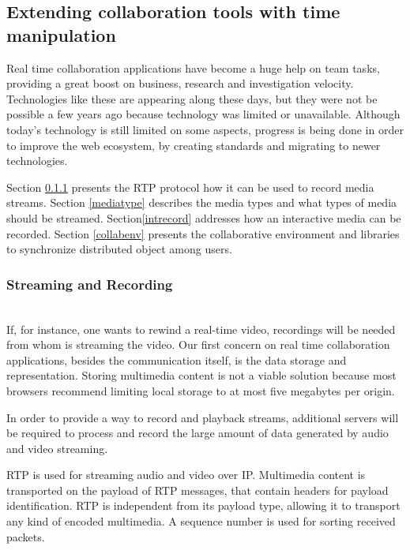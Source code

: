 \subsection{Extending collaboration tools with time manipulation}
\label{collab}

Real time collaboration applications have become a huge help on team tasks, providing a great boost on business, research and investigation velocity. Technologies like these are appearing along these days, but they were not be possible a few years ago because technology was limited or unavailable. Although today's technology is still limited on some aspects, progress is being done in order to improve the web ecosystem, by creating standards and migrating to newer technologies.

Section \ref{recstream} presents the RTP protocol how it can be used to record media streams. Section \ref{mediatype} describes the media types and what types of media should be streamed. Section\ref{intrecord} addresses how an interactive media can be recorded. Section \ref{collabenv} presents the collaborative environment and libraries to synchronize distributed object among users.

\subsubsection{Streaming and Recording}\label{recstream}~\\
	If, for instance, one wants to rewind a real-time video, recordings will be needed from whom is streaming the video. 
 Our first concern on real time collaboration applications, besides the communication itself, is the data storage and representation. Storing multimedia content is not a viable solution because most browsers recommend limiting local storage to at most five megabytes per origin.

 	In order to provide a way to record and playback streams, additional servers will be required to process and record the large amount of data generated by audio and video streaming.

 \ac{RTP}\cite{rfc3550} is used for streaming audio and video over \ac{IP}.
 Multimedia content is transported on the payload of \ac{RTP} messages, that contain headers for payload identification. \ac{RTP} is independent from its payload type, allowing it to transport any kind of encoded multimedia. A sequence number is used for sorting received packets.

